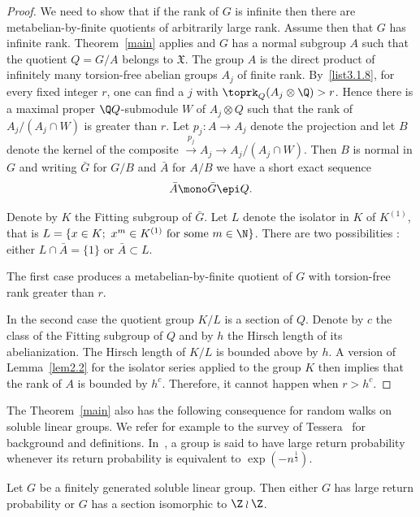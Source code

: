 \begin{proof}
We need to show that if the rank of $G$ is infinite then there are metabelian-by-finite quotients of arbitrarily large rank. Assume then that $G$ has infinite rank. Theorem~\ref{main} applies and $G$ has a normal subgroup $A$ such that the quotient $Q = G/A$ belongs to $\mathfrak X$. The group $A$ is the direct product of infinitely many torsion-free abelian groups $A_j$ of finite rank.
By~\eqref{list3.1.8}, for every fixed integer $r$, one can find a $j$ with $\toprk_Q(A_j\otimes\Q) > r$. Hence there is a maximal proper $\Q Q$-submodule $W$ of $A_j\otimes Q$ such that the rank of $A_j/(A_j\cap W)$ is greater than $r$. Let $p_j:A\to A_j$ denote the projection and let $B$ denote the kernel of the composite $\stackrel{p_j}{\to} A_j\to A_j/(A_j\cap W)$. Then $B$ is normal in $G$ and writing $\bar G$ for $G/B$ and $\bar A$ for $A/B$ we have a short exact sequence
\[
\bar A \mono \bar G \epi Q.
\]

Denote by $K$ the Fitting subgroup of $\bar G$. Let $L$ denote the isolator in $K$ of $K^{(1)}$, that is $L=\{x\in K;\ x^m\in K^{(1)}\text{ for some }m\in\N\}$. There are two possibilities : either $L\cap \bar A = \{1\}$ or $\bar A \subset L$.

The first case produces a metabelian-by-finite quotient of $G$ with torsion-free rank greater than $r$.

In the second case the quotient group $K/L$ is a section of $Q$. Denote by $c$ the class of the Fitting subgroup of $Q$ and by $h$ the Hirsch length of its abelianization. The Hirsch length of $K/L$ is bounded above by $h$. A version of Lemma~\ref{lem2.2} for the isolator series applied to the group $K$ then implies that the rank of $A$ is bounded by $h^c$. Therefore, it cannot happen when $r>h^c$.
\end{proof}

The Theorem~\ref{main} also has the following consequence for random walks on soluble linear groups. We refer for example to the survey of Tessera~\cite{Tsurvey} for background and definitions. In~\cite{J}, a group is said to have large return probability whenever its return probability is equivalent to $\exp(-n^\frac1{3})$.

\begin{corob}\label{corob3}
Let $G$ be a finitely generated soluble linear group. Then either $G$ has large return probability or $G$ has a section isomorphic to $\Z\wr\Z$.
\end{corob}

